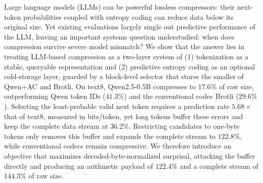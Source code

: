 Large language models (LLMs) can be powerful lossless compressors:
their next-token probabilities coupled with entropy coding can reduce data
below its original size. Yet existing evaluations largely single out
predictive performance of the LLM, leaving an important systems
question understudied: when does compression survive severe model
mismatch? We show that the answer lies in treating LLM-based
compression as a two-layer system of (1) tokenization as a stable,
queryable representation and (2) predictive entropy coding as an
optional cold-storage layer, guarded by a block-level selector that
stores the smaller of Qwen+AC and Brotli. On text8, Qwen2.5-0.5B
compresses to $17.6\%$ of raw size,
outperforming Qwen token IDs ($41.3\%$) and the conventional codec Brotli ($29.6\%$). Selecting
the least-probable valid next token requires a prediction rate $5.68\times$ that of
text8, measured in bits/token, yet long tokens buffer these
errors and keep the complete data stream at $36.2\%$. Restricting
candidates to one-byte tokens only removes this buffer and expands the
complete stream to $122.8\%$, while conventional codecs remain
compressive. We therefore introduce an objective that maximizes
decoded-byte-normalized surprisal, attacking the buffer directly and producing
an arithmetic payload of $122.4\%$ and a complete stream of $144.3\%$ of raw size.

